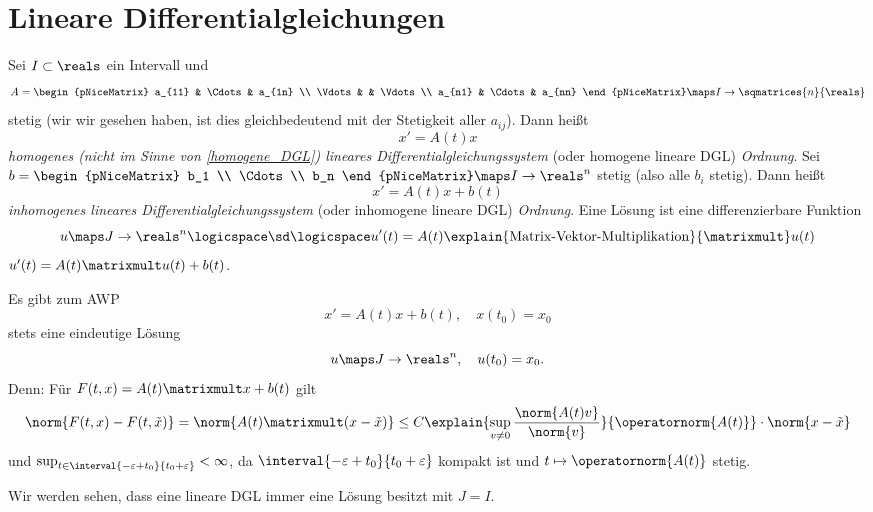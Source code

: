 \section*{Lineare Differentialgleichungen}
\begin{definition}\label{homogenes_lineares_dgl_system}
  Sei \( I\subset \reals \) ein Intervall und 
  \begin{equation*}
    A=\begin{pNiceMatrix} a_{11} & \Cdots & a_{1n} \\ \Vdots &  & \Vdots \\ a_{n1} & \Cdots & a_{nn} \end{pNiceMatrix}\maps I\to \sqmatrices{n}{\reals}
  \end{equation*}
  stetig (wir wir gesehen haben, ist dies gleichbedeutend mit der Stetigkeit aller \( a_{ij} \)). Dann heißt
  \begin{equation*}
    x'=A(t)x
  \end{equation*}
  \emph{homogenes (nicht im Sinne von \ref{homogene_DGL}) lineares Differentialgleichungssystem} (oder homogene lineare DGL) \emph{ Ordnung}. Sei \( b=\begin{pNiceMatrix} b_1 \\ \Cdots \\ b_n \end{pNiceMatrix}\maps I\to \reals^n \) stetig (also alle \( b_i \) stetig). Dann heißt
  \begin{equation*}
    x'=A(t)x+b(t)
  \end{equation*}
  \emph{inhomogenes lineares Differentialgleichungssystem} (oder inhomogene lineare DGL) \emph{ Ordnung}. Eine Lösung ist eine differenzierbare Funktion
  \begin{equation*}
    u\maps J\to \reals^n \logicspace \text{\sd}\logicspace u'(t)=A(t)\explain{\text{Matrix-Vektor-Multiplikation}}{\matrixmult} u(t)
  \end{equation*}
  \bzw \( u'(t)=A(t)\matrixmult u(t)+b(t) \).
\end{definition}
\begin{bemerkung*}
  Es gibt zum AWP
  \begin{equation*}
    x'=A(t)x+b(t),\quad x(t_0)=x_0
  \end{equation*}
  stets eine eindeutige Lösung
  \begin{equation*}
    u\maps J\to \reals^n, \quad u(t_0)=x_0.
  \end{equation*}
  Denn: Für \( F(t,x)=A(t)\matrixmult x+b(t) \) gilt
  \begin{equation*}
    \norm{F(t,x)-F(t,\tilde{x})}=\norm{A(t)\matrixmult(x-\tilde{x})}\leq C\explain{\sup_{v\neq 0}\frac{\norm{A(t)v}}{\norm{v}}}{\operatornorm{A(t)}}\cdot\norm{x-\tilde{x}}
  \end{equation*}
  und \( \sup_{t\in \interval{-\varepsilon+t_0}{t_0+\varepsilon}}<\infty \), da \( \interval{-\varepsilon+t_0}{t_0+\varepsilon} \) kompakt ist und \( t\mapsto \operatornorm{A(t)} \) stetig. 

  Wir werden sehen, dass eine lineare DGL immer eine Lösung besitzt mit \( J=I \).
\end{bemerkung*}

